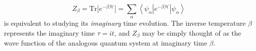 \begin{equation}\label{eq:partitionBeta}
Z_\beta = \text{Tr} \big[ e^{-\beta \mathcal{H} } \big] = \sum_{\alpha} \left\langle \psi_\alpha | e^{-\beta \mathcal{H} } | \psi_\alpha \right\rangle
\end{equation}
is equivalent to studying its \emph{imaginary} time evolution.
The inverse temperature $\beta$ represents the imaginary time $\tau = it$, and $Z_\beta$ may be simply thought of as the wave function of the analogous quantum system at imaginary time $\beta$.
%
%
%
%
%
%
%
